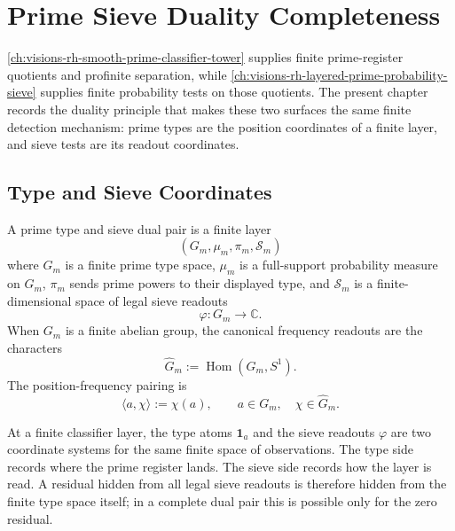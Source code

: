 \chapter{Prime Sieve Duality Completeness}
\label{ch:visions-rh-prime-sieve-duality-completeness}

\autoref{ch:visions-rh-smooth-prime-classifier-tower} supplies finite
prime-register quotients and profinite separation, while
\autoref{ch:visions-rh-layered-prime-probability-sieve} supplies
finite probability tests on those quotients.  The present chapter
records the duality principle that makes these two surfaces the same
finite detection mechanism: prime types are the position coordinates of
a finite layer, and sieve tests are its readout coordinates.

\section{Type and Sieve Coordinates}
\label{sec:rh-prime-sieve-duality-type-sieve-coordinates}

\begin{definition}
\label{def:rh-prime-type-sieve-dual-pair}
A prime type and sieve dual pair is a finite layer
$$
(G_m,\mu_m,\pi_m,\mathcal S_m)
$$
where $G_m$ is a finite prime type space, $\mu_m$ is a full-support
probability measure on $G_m$, $\pi_m$ sends prime powers to their
displayed type, and $\mathcal S_m$ is a finite-dimensional space of
legal sieve readouts
$$
\varphi:G_m\to\mathbb C.
$$
When $G_m$ is a finite abelian group, the canonical frequency readouts
are the characters
$$
\widehat G_m:=\operatorname{Hom}(G_m,S^1).
$$
The position-frequency pairing is
$$
\langle a,\chi\rangle:=\chi(a),
\qquad
a\in G_m,\quad \chi\in\widehat G_m.
$$
\end{definition}

\begin{principle}
\label{prin:rh-prime-types-sieve-methods-dual-coordinates}
At a finite classifier layer, the type atoms $\mathbf 1_a$ and the
sieve readouts $\varphi$ are two coordinate systems for the same finite
space of observations.  The type side records where the prime register
lands.  The sieve side records how the layer is read.  A residual hidden
from all legal sieve readouts is therefore hidden from the finite type
space itself; in a complete dual pair this is possible only for the zero
residual.
\end{principle}

